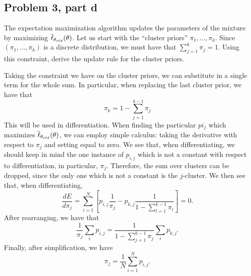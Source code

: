 \subsection{Problem 3, part d}
The expectation maximization algorithm updates the parameters of the mixture by maximizing $\overline{\ell}_{\theta_{old}}(\theta)$. Let us start with the ``cluster priors'' $\pi_1, ..., \pi_k.$ Since $(\pi_1, ..., \pi_k)$ is a discrete distribution, we must have that $\sum_{j = 1}^k \pi_j = 1$. Using this constraint, derive the update rule for the cluster priors. 
\partbreak
\begin{solution}

    Taking the constraint we have on the cluster priors, we can substitute in a single term for the whole sum. In particular, when replacing the last cluster prior, we have that 
    \[\pi_k = 1 - \sum_{j = 1}^{k-1} \pi_j\]
    This will be used in differentiation. When finding the particular $pi_j$ which maximizes $\overline{\ell}_{\theta_{old}}(\theta)$, we can employ simple calculus: taking the derivative with respect to $\pi_j$ and setting equal to zero. We see that, when differentiating, we should keep in mind the one instance of $p_{i, j}$ which is not a constant with respect to differentiation, in particular, $\pi_j$. Therefore, the sum over clusters can be dropped, since the only one which is not a constant is the $j$-cluster. We then see that, when differentiating, 
    \[\frac{d E}{d\pi_j} = \sum_{i = 1}^N \left[p_{i, j}\frac{1}{\pi_j} - p_{k, j}\frac{1}{1 - \sum_{l = 1}^{k-1} \pi_l}\right] = 0.\]
    After rearranging, we have that
    \[\frac{1}{\pi_j}\sum_i p_{i, j} = \frac{1}{1 - \sum_{j = 1}^{k-1} \pi_j}\sum_i p_{k, j}. \]
    Finally, after simplification, we have
    \[\pi_j = \frac{1}{N}\sum_{i = 1}^N p_{i, j}.\]
    
\end{solution}


\newpage

